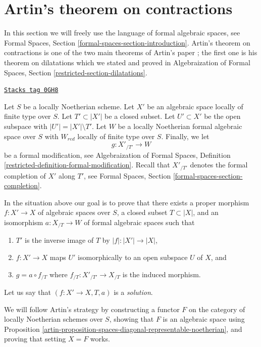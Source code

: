 \section{Artin's theorem on contractions}
\label{artin-section-contractions}
In this section we will freely use the language of formal algebraic spaces,
see Formal Spaces, Section \ref{formal-spaces-section-introduction}.
Artin's theorem on contractions is one of the two main theorems of
Artin's paper \cite{ArtinII}; the first one is his theorem on dilatations
which we stated and proved in Algebraization of Formal Spaces,
Section \ref{restricted-section-dilatations}.

\begin{definition}
\label{artin-situation-contractions}
\href{https://stacks.math.columbia.edu/tag/0GH8}{\texttt{Stacks tag 0GH8}}

Let $S$ be a locally Noetherian scheme. Let $X'$ be an algebraic space
locally of finite type over $S$. Let $T' \subset |X'|$ be a closed
subset. Let $U' \subset X'$ be the open subspace with
$|U'| = |X'| \setminus T'$. Let $W$ be a locally Noetherian
formal algebraic space over $S$ with $W_{red}$ locally of finite type
over $S$. Finally, we let
$$
g : X'_{/T'} \longrightarrow W
$$
be a formal modification, see
Algebraization of Formal Spaces, Definition
\ref{restricted-definition-formal-modification}.
Recall that $X'_{/T'}$ denotes the formal completion of $X'$ along
$T'$, see Formal Spaces, Section \ref{formal-spaces-section-completion}.
\end{definition}

In the situation above our goal is to prove that there exists a
proper morphism $f : X' \to X$ of algebraic spaces over $S$,
a closed subset $T \subset |X|$, and an isomorphism
$a : X_{/T} \to W$ of formal algebraic spaces such that
\begin{enumerate}
\item $T'$ is the inverse image of $T$ by $|f| : |X'| \to |X|$,
\item $f : X' \to X$ maps $U'$ isomorphically to
an open subspace $U$ of $X$, and
\item $g = a \circ f_{/T}$ where $f_{/T} : X'_{/T'} \to X_{/T}$
is the induced morphism.
\end{enumerate}
Let us say that $(f : X' \to X, T, a)$ is a {\it solution}.

\medskip\noindent
We will follow Artin's strategy by constructing a functor $F$ on
the category of locally Noetherian schemes over $S$, showing that $F$ is an
algebraic space using
Proposition \ref{artin-proposition-spaces-diagonal-representable-noetherian},
and proving that setting $X = F$ works.

